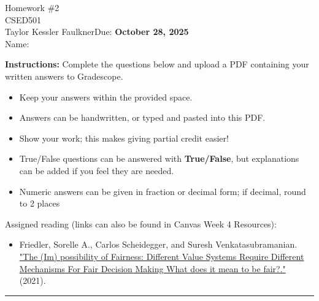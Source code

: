 \documentclass[11pt]{article}
\newcommand{\Class}{CSED501}
\newcommand{\Instructor}{Taylor Kessler Faulkner}
\newcommand{\DueDate}{Due: \textbf{October 28, 2025}}
\newcommand{\HomeworkTitle}{Homework \#2}
\newcommand{\StudentName}{\underline{\hspace{5cm}} }
\begin{document}
\begin{center}
  {\LARGE \HomeworkTitle} \\
  \vspace{6pt}
  {\large \Class} \\
  \vspace{4pt}
  \Instructor \hfill \DueDate \\
  \vspace{8pt}
  Name: \StudentName
\end{center}

\textbf{Instructions:}
Complete the questions below and upload a PDF containing your written answers to Gradescope. 
\begin{itemize}
    \item Keep your answers within the provided space.
    \item Answers can be handwritten, or typed and pasted into this PDF. 
    \item Show your work; this makes giving partial credit easier!
    \item True/False questions can be answered with \textbf{True/False}, but explanations can be added if you feel they are needed.
    \item Numeric answers can be given in fraction or decimal form; if decimal, round to 2 places
\end{itemize}

Assigned reading (links can also be found in Canvas Week 4 Resources):
\begin{itemize}
\item Friedler, Sorelle A., Carlos Scheidegger, and Suresh Venkatasubramanian. \href{https://cacm.acm.org/research/the-impossibility-of-fairness/}{"The (Im) possibility of Fairness: Different Value Systems Require Different Mechanisms For Fair Decision Making What does it mean to be fair?."} (2021).
\end{itemize}

\vspace{12pt}
\hrule
\vspace{12pt}



\newpage

\end{document}

